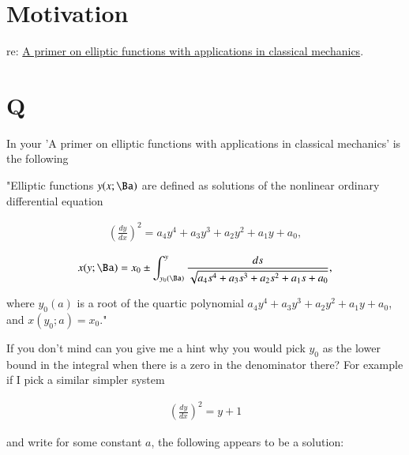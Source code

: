 %

\title{}

\beginArtNoToc

\section{Motivation}

re: 
\href{http://arxiv.org/abs/0711.4064}{A primer on elliptic functions with applications in classical mechanics}.

\section{Q}

In your 'A primer on elliptic functions with applications in classical mechanics' is the following

"Elliptic functions $y(x; \Ba)$ are defined as solutions of the nonlinear ordinary differential equation

\begin{align*}
\left(\frac{dy}{dx}\right)^2 = a_4 y^4 + a_3 y^3 + a_2 y^2 + a_1 y + a_0,
\end{align*}

\begin{align*}
x(y; \Ba) = x_0 \pm \int_{y_0(\Ba)}^y \frac{ds}{\sqrt{
a_4 s^4 + a_3 s^3 + a_2 s^2 + a_1 s + a_0
}},
\end{align*}

where $y_0(a)$ is a root of the quartic polynomial $a_4 y^4 + a_3 y^3 + a_2 y^2 + a_1 y + a_0$, and $x(y_0; a) = x_0$."

If you don't mind can you give me a hint why you would pick $y_0$ as the lower bound in the integral when there is a zero in the denominator there?  For example if I pick a similar simpler system

\begin{align*}
\left(\frac{dy}{dx}\right)^2 = y + 1
\end{align*}

and write for some constant $a$, the following appears to be a solution:

